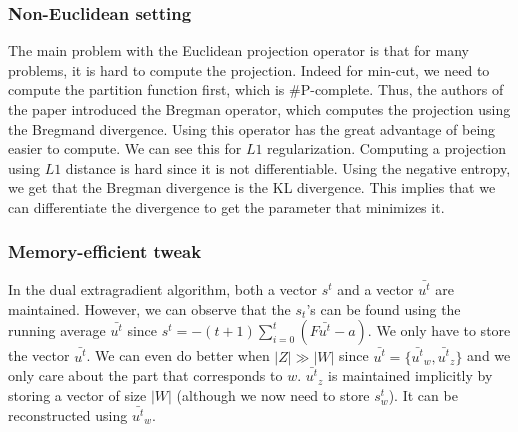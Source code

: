 \clearpage
\subsubsection{Non-Euclidean setting}
The main problem with the Euclidean projection operator is that for many
problems, it is hard to compute the projection. Indeed for min-cut, we need to
compute the partition function first, which is \#P-complete. Thus, the authors
of the paper introduced the Bregman operator, which computes the projection
using the Bregmand divergence. Using this operator has the great advantage of
being easier to compute. We can see this for $L1$ regularization. Computing a
projection using $L1$ distance is hard since it is not differentiable. Using the
negative entropy, we get that the Bregman divergence is the KL divergence. This
implies that we can differentiate the divergence to get the parameter that
minimizes it.

\subsubsection{Memory-efficient tweak}
In the dual extragradient algorithm, both a vector $s^t$ and a vector
$\bar{u^t}$ are maintained. However, we can observe that the $s_t$'s can be
found using the running average $\bar{u^t}$ since $s^t = -(t + 1 ) \sum_{i=0}^t
(F \bar{u^t} - a)$. We only have to store the vector $\bar{u^t}$. We can even do
better when $|{Z}| \gg |{W}|$ since $\bar{u^t} = \{
\bar{u^t}_w,\bar{u^t}_z \}$ and we only care about the part that corresponds to
$w$. $\bar{u^t}_z$ is maintained implicitly by storing a vector of size
$|{W}|$ (although we now need to store $s_w^t$). It can be reconstructed
using $\bar{u^t}_w$.


